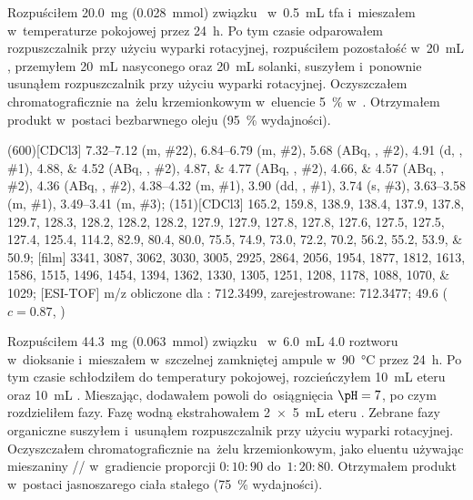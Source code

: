 Rozpuściłem \SI{20.0}{\milli\gram} (\SI{0.028}{\milli\mol}) związku~
  w~\SI{0.5}{\milli\liter} \gls{tfa} i~mieszałem w~temperaturze pokojowej przez \SI{24}{\hour}.
Po tym czasie odparowałem rozpuszczalnik przy użyciu wyparki rotacyjnej,
  rozpuściłem pozostałość w~\SI{20}{\milli\liter} ,
  przemyłem \SI{20}{\milli\liter} nasyconego  oraz \SI{20}{\milli\liter} solanki,
  suszyłem  i~ponownie usunąłem rozpuszczalnik przy użyciu wyparki rotacyjnej.
Oczyszczałem chromatograficznie na~żelu krzemionkowym w~eluencie \SI{5}{\percent}  w~.
Otrzymałem produkt w~postaci bezbarwnego oleju (\SI{95}{\percent} wydajności).

\begin{fullexp}
  \NMR(600)[CDCl3] \numrange{7.32}{7.12} (m, \#{22}), \numrange{6.84}{6.79} (m, \#{2}), \num{5.68} (ABq, , \#{2}), \num{4.91} (d, , \#{1}), \numlist{4.88;4.52} (ABq, , \#{2}), \numlist{4.87;4.77} (ABq, , \#{2}), \numlist{4.66;4.57} (ABq, , \#{2}), \num{4.36} (ABq, , \#{2}), \numrange{4.38}{4.32} (m, \#{1}), \num{3.90} (dd, , \#{1}), \num{3.74} (s, \#{3}), \numrange{3.63}{3.58} (m, \#{1}), \numrange{3.49}{3.41} (m, \#{3});
  (151)[CDCl3] \numlist{165.2; 159.8; 138.9; 138.4; 137.9; 137.8; 129.7; 128.3; 128.2; 128.2; 128.2; 127.9; 127.9; 127.8; 127.8; 127.6; 127.5; 127.5; 127.4; 125.4; 114.2; 82.9; 80.4; 80.0; 75.5; 74.9; 73.0; 72.2; 70.2; 56.2; 55.2; 53.9; 50.9};
  [film] \numlist{3341; 3087; 3062; 3030; 3005; 2925; 2864; 2056; 1954; 1877; 1812; 1613; 1586; 1515; 1496; 1454; 1394; 1362; 1330; 1305; 1251; 1208; 1178; 1088; 1070; 1029};
  [ESI-TOF] m/z obliczone dla : \num{712.3499}, zarejestrowane: \num{712.3477};
  \data{[$\alpha^{23}_D$]~$=$} \num{49.6} ($c = 0.87$, )
\end{fullexp}

Rozpuściłem \SI{44.3}{\milli\gram} (\SI{0.063}{\milli\mol}) związku~
  w~\SI{6.0}{\milli\liter} \SI{4.0}{\Molar} roztworu  w~dioksanie i~mieszałem
  w~szczelnej zamkniętej ampule w~\SI{90}{\degreeCelsius} przez \SI{24}{\hour}.
Po tym czasie schłodziłem do temperatury pokojowej, rozcieńczyłem \SI{10}{\milli\liter}
  eteru  oraz \SI{10}{\milli\liter} .
Mieszając, dodawałem powoli  do~osiągnięcia $\pH = 7$, po czym rozdzieliłem fazy.
Fazę wodną ekstrahowałem \SI[product-units = single]{2 x 5}{\mL} eteru .
Zebrane fazy organiczne suszyłem  i~usunąłem rozpuszczalnik przy użyciu wyparki rotacyjnej.
Oczyszczałem chromatograficznie na~żelu krzemionkowym, jako eluentu używając mieszaniny
  // w~gradiencie proporcji $0:10:90$ do~$1:20:80$.
Otrzymałem produkt w~postaci jasnoszarego ciała stałego (\SI{75}{\percent} wydajności).

